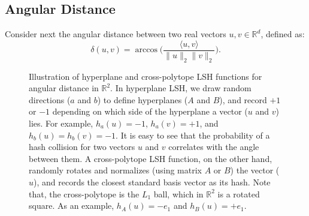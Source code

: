 \subsection{Angular Distance}
\label{section:lsh:angular}
Consider next the angular distance between two real vectors $u, v \in \mathbb{R}^d$, defined as:
\begin{equation}
    \label{equation:lsh:angular-distance}
    \delta(u, v) = \arccos \Big( \frac{\langle u, v \rangle}{\lVert u \rVert_2 \lVert v \rVert_2} \Big).
\end{equation}

\begin{figure}[t]
    \centering
    \caption{Illustration of hyperplane and cross-polytope LSH functions
    for angular distance in $\mathbb{R}^2$. In hyperplane LSH, we draw random
    directions ($a$ and $b$) to define hyperplanes ($A$ and $B$), and record
    $+1$ or $-1$ depending on which side of the hyperplane a vector ($u$ and $v$)
    lies. For example, $h_a(u)=-1$, $h_a(v)=+1$, and $h_b(u)=h_b(v)=-1$. It is easy
    to see that the probability of a hash collision for two vectors $u$ and $v$ correlates
    with the angle between them. A cross-polytope LSH function, on the other hand,
    randomly rotates and normalizes (using matrix $A$ or $B$) the vector ($u$),
    and records the closest standard basis vector as its hash. Note that, the cross-polytope
    is the $L_1$ ball, which in $\mathbb{R}^2$ is a rotated square. As an example,
    $h_A(u) = -e_1$ and $h_B(u) = +e_1$.}
    \label{figure:lsh:angular}
\end{figure}

